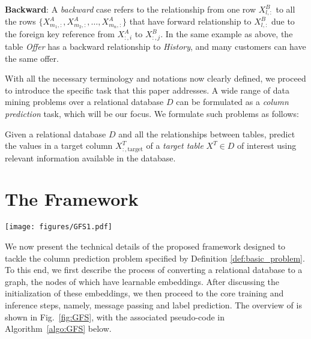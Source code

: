 \header
\textbf{Backward}: A \textit{backward} case refers to the relationship from one row $X^{B}_{l, :}$ to all the rows $\{X^{A}_{m_1, :}, X^{A}_{m_2, :}, \ldots ,X^{A}_{m_n, :}\}$ that have forward relationship to $X^{B}_{l, :}$ due to the foreign key reference from $X^{A}_{:,i}$ to $X^{B}_{:,j}$. In the same example as above, the table \textit{Offer} has a backward relationship to \textit{History}, and many customers can have the same offer.

With all the necessary terminology and notations now clearly defined, we proceed to introduce the specific task that this paper addresses. A wide range of data mining problems over a relational database $D$ can be formulated as a \emph{column prediction} task, which will be our focus. We formulate such problems as follows: 
\begin{definition} \label{def:basic_problem}
    Given a relational database $D$ and all the relationships between tables, predict the values in a target column $X^{T}_{:, \text{target}}$ of a \emph{target table} $X^{T} \in D$ of interest using relevant information available in the database.%
\end{definition}

\section{The \model{} Framework}\label{sec:model}

\begin{figure*}
    \centering
    \texttt{[image: figures/GFS1.pdf]}
    \caption{Overview of the \model{} framework. We use the node highlighted in red as an example to demonstrate how the node in the graph updates its node embedding and how predictions are made if the node is the target node. Some notations are abbreviated and some columns in tables are not shown for simplicity.}
    \label{fig:GFS}
\end{figure*}
We now present the technical details of the proposed \model{} framework designed to tackle the column prediction problem specified by Definition \ref{def:basic_problem}.  To this end, we first describe the process of converting a relational database to a graph, the nodes of which have learnable embeddings.  After discussing the initialization of these embeddings, we then proceed to the core training and inference steps, namely, message passing and label prediction.  The overview of \model{} is shown in Fig.~\ref{fig:GFS}, with the associated pseudo-code in Algorithm~\ref{algo:GFS} below. 

